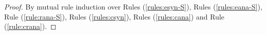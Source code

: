 \begin{proof}
By mutual rule induction over Rules (\ref{rules:esyn-S}), Rules (\ref{rules:eana-S}), Rule (\ref{rule:rana-S}), Rules (\ref{rules:csyn}), Rules (\ref{rules:cana}) and Rule (\ref{rule:crana}). 

\end{proof}



